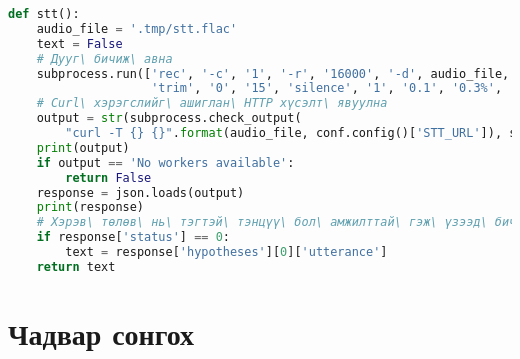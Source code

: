 \begin{lstlisting}[language=Python]
def stt():
    audio_file = '.tmp/stt.flac'
    text = False
    # Дууг\ бичиж\ авна
    subprocess.run(['rec', '-c', '1', '-r', '16000', '-d', audio_file,
                    'trim', '0', '15', 'silence', '1', '0.1', '0.3%', '1', '3.0', '0.3%'])
    # Curl\ хэрэгслийг\ ашиглан\ HTTP хүсэлт\ явуулна
    output = str(subprocess.check_output(
        "curl -T {} {}".format(audio_file, conf.config()['STT_URL']), shell=True), 'utf-8')
    print(output)
    if output == 'No workers available':
        return False
    response = json.loads(output)
    print(response)
    # Хэрэв\ төлөв\ нь\ тэгтэй\ тэнцүү\ бол\ амжилттай\ гэж\ үзээд\ бичвэрийг\ буцаана
    if response['status'] == 0:
        text = response['hypotheses'][0]['utterance']
    return text
\end{lstlisting}

\chapter{Чадвар сонгох}
\label{appendix:skill}

